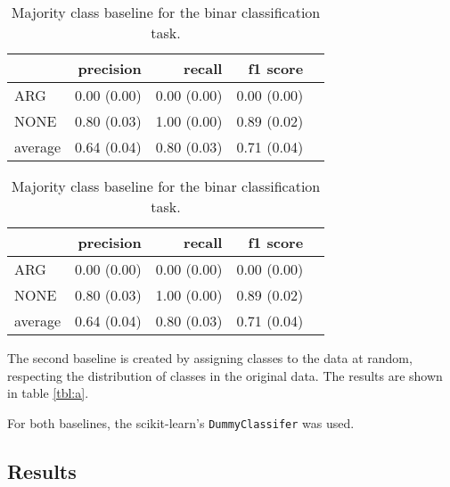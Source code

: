 \begin{table}[!htb]
    \begin{minipage}{.5\linewidth}
      \caption{Random baseline for the binary classification task.}
      \label{foo}
      \centering
\begin{tabular}{@{}lrrrr@{}}
\toprule
 	&	 precision &	 recall &	 f1 score  \\ \midrule 
ARG	&	 0.00 \scriptsize{(0.00)} &	 0.00 \scriptsize{(0.00)} &	 0.00 \scriptsize{(0.00)}  \\ 
NONE	&	 0.80 \scriptsize{(0.03)} &	 1.00 \scriptsize{(0.00)} &	 0.89 \scriptsize{(0.02)}  \\ 
average	&	 0.64 \scriptsize{(0.04)} &	 0.80 \scriptsize{(0.03)} &	 0.71 \scriptsize{(0.04)}  \\ 
\bottomrule
\end{tabular}
    \end{minipage}%
    \begin{minipage}{.5\linewidth}
      \centering
        \caption{Majority class baseline for the binar classification task.}
\begin{tabular}{@{}lrrrr@{}}
\toprule
 	&	 precision &	 recall &	 f1 score  \\ \midrule 
ARG	&	 0.00 \scriptsize{(0.00)} &	 0.00 \scriptsize{(0.00)} &	 0.00 \scriptsize{(0.00)}  \\ 
NONE	&	 0.80 \scriptsize{(0.03)} &	 1.00 \scriptsize{(0.00)} &	 0.89 \scriptsize{(0.02)}  \\ 
average	&	 0.64 \scriptsize{(0.04)} &	 0.80 \scriptsize{(0.03)} &	 0.71 \scriptsize{(0.04)}  \\ 
\bottomrule
\end{tabular}
    \end{minipage} 
\end{table}



The second baseline is created by assigning classes to the data at random, respecting the distribution of classes in the original data. The results are shown in table \ref{tbl:a}.

For both baselines, the scikit-learn's \texttt{DummyClassifer} was used.



\subsection{Results}

